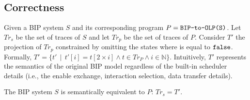 \subsection{Correctness}
%
Given a BIP system $S$ and its corresponding \caig program $P = \texttt{BIP-to-OLP(S)}$. 
Let $Tr_s$ be the set of traces of $S$ and let $Tr_p$ be the set of traces of $P$. 
Consider $T'$ the projection of $Tr_p$ constrained by omitting the states where  is equal to $\mathtt{false}$. 
Formally, $T'  = \{t' \,\mid\, t'[i] = t[2\times i] \wedge t \in Tr_P \wedge i \in \mathbb{N}\}$. 
Intuitively, $T'$ represents the semantics of the original BIP model regardless of the built-in scheduler details 
(i.e., the enable exchange, interaction selection, data transfer details). 
%
\begin{theorem}
\label{theorem:correct}
The BIP system $S$ is semantically equivalent to $P$: $Tr_s=T'$. 
\end{theorem}
